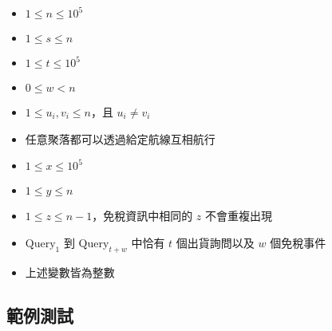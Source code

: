 \begin{itemize}
\tightlist
\item
  \begin{math}1 \le n \le 10^5\end{math}
\item
  \begin{math}1 \le s \le n\end{math}
\item
  \begin{math}1 \le t \le 10^5\end{math}
\item
  \begin{math}0 \le w < n\end{math}
\item
  \begin{math}1 \le u_i, v_i \le n\end{math}，且
  \begin{math}u_i \neq v_i\end{math}
\item
  任意聚落都可以透過給定航線互相航行
\item
  \begin{math}1 \le x \le 10^5\end{math}
\item
  \begin{math}1 \le y \le n\end{math}
\item
  \begin{math}1 \le z \le n-1\end{math}，免稅資訊中相同的
  \begin{math}z\end{math} 不會重複出現
\item
  \begin{math}\textrm{Query}_1\end{math} 到
  \begin{math}\textrm{Query}_{t+w}\end{math} 中恰有
  \begin{math}t\end{math} 個出貨詢問以及 \begin{math}w\end{math}
  個免稅事件
\item
  上述變數皆為整數
\end{itemize}

\subsection{範例測試}

